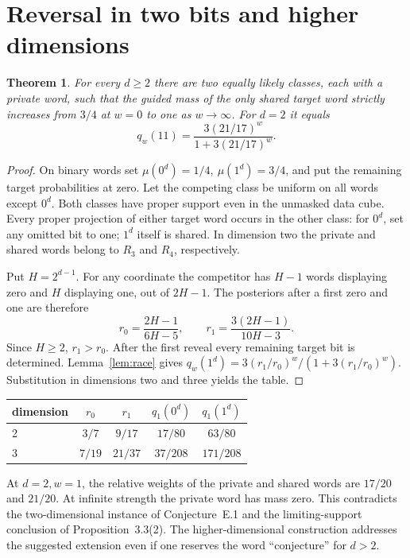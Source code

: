 \documentclass[11pt]{article}
\newtheorem{theorem}{Theorem}
\begin{document}
\section{Reversal in two bits and higher dimensions}
\begin{theorem}\label{thm:diagonal}
For every \(d\ge2\) there are two equally likely classes, each with a private word, such that the guided mass of the only shared target word strictly increases from \(3/4\) at \(w=0\) to one as \(w\to\infty\). For \(d=2\) it equals
\[
 q_w(11)=\frac{3(21/17)^w}{1+3(21/17)^w}.
\]
\end{theorem}
\begin{proof}
On binary words set \(\mu(0^d)=1/4,\ \mu(1^d)=3/4\), and put the remaining target probabilities at zero. Let the competing class be uniform on all words except \(0^d\). Both classes have proper support even in the unmasked data cube. Every proper projection of either target word occurs in the other class: for \(0^d\), set any omitted bit to one; \(1^d\) itself is shared. In dimension two the private and shared words belong to \(R_3\) and \(R_4\), respectively.

Put \(H=2^{d-1}\). For any coordinate the competitor has \(H-1\) words displaying zero and \(H\) displaying one, out of \(2H-1\). The posteriors after a first zero and one are therefore
\[
 r_0=\frac{2H-1}{6H-5},\qquad r_1=\frac{3(2H-1)}{10H-3}.
\]
Since \(H\ge2\), \(r_1>r_0\). After the first reveal every remaining target bit is determined. Lemma~\ref{lem:race} gives \(q_w(1^d)=3(r_1/r_0)^w/(1+3(r_1/r_0)^w)\). Substitution in dimensions two and three yields the table.
\end{proof}
\begin{center}
\begin{tabular}{lcccc}
\toprule
dimension & \(r_0\) & \(r_1\) & \(q_1(0^d)\) & \(q_1(1^d)\)\\
\midrule
2 & \(3/7\) & \(9/17\) & \(17/80\) & \(63/80\)\\
3 & \(7/19\) & \(21/37\) & \(37/208\) & \(171/208\)\\
\bottomrule
\end{tabular}
\end{center}
At \(d=2,w=1\), the relative weights of the private and shared words are \(17/20\) and \(21/20\). At infinite strength the private word has mass zero. This contradicts the two-dimensional instance of Conjecture~E.1 and the limiting-support conclusion of Proposition~3.3(2). The higher-dimensional construction addresses the suggested extension even if one reserves the word ``conjecture'' for \(d>2\).
\end{document}
